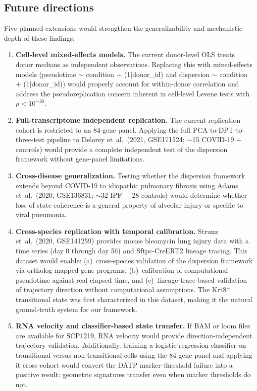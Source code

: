 \documentclass[11pt,a4paper]{article}
\begin{document}
\subsection{Future directions}

Five planned extensions would strengthen the generalizability and mechanistic depth of these findings:

\begin{enumerate}

\item \textbf{Cell-level mixed-effects models.} The current donor-level OLS treats donor medians as independent observations. Replacing this with mixed-effects models (pseudotime $\sim$ condition $+$ (1$|$donor\_id) and dispersion $\sim$ condition $+$ (1$|$donor\_id)) would properly account for within-donor correlation and address the pseudoreplication concern inherent in cell-level Levene tests with $p < 10^{-30}$.

\item \textbf{Full-transcriptome independent replication.} The current replication cohort is restricted to an 84-gene panel. Applying the full PCA-to-DPT-to-three-test pipeline to Delorey et~al.\ (2021, GSE171524; $\sim$15 COVID-19 + controls) would provide a complete independent test of the dispersion framework without gene-panel limitations.

\item \textbf{Cross-disease generalization.} Testing whether the dispersion framework extends beyond COVID-19 to idiopathic pulmonary fibrosis using Adams et~al.\ (2020, GSE136831; $\sim$32 IPF + 28 controls) would determine whether loss of state coherence is a general property of alveolar injury or specific to viral pneumonia.

\item \textbf{Cross-species replication with temporal calibration.} Strunz et~al.\ (2020, GSE141259) provides mouse bleomycin lung injury data with a time series (day 0 through day 56) and Sftpc-CreERT2 lineage tracing. This dataset would enable: (a)~cross-species validation of the dispersion framework via ortholog-mapped gene programs, (b)~calibration of computational pseudotime against real elapsed time, and (c)~lineage-trace-based validation of trajectory direction without computational assumptions. The Krt8$^+$ transitional state was first characterized in this dataset, making it the natural ground-truth system for our framework.

\item \textbf{RNA velocity and classifier-based state transfer.} If BAM or loom files are available for SCP1219, RNA velocity would provide direction-independent trajectory validation. Additionally, training a logistic regression classifier on transitional versus non-transitional cells using the 84-gene panel and applying it cross-cohort would convert the DATP marker-threshold failure into a positive result: geometric signatures transfer even when marker thresholds do not.

\end{enumerate}
\end{document}
